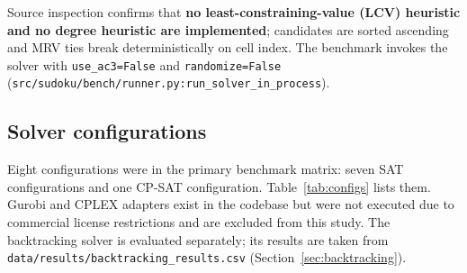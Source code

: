 \documentclass[a4paper,fleqn]{cas-sc}
\newcommand{\code}[1]{\texttt{\nolinkurl{#1}}}
\begin{document}
Source inspection confirms that \textbf{no least-constraining-value (LCV) heuristic and no degree heuristic are implemented}; candidates are sorted ascending and MRV ties break deterministically on cell index. The benchmark invokes the solver with \texttt{use\_ac3=False} and \texttt{randomize=False} (\code{src/sudoku/bench/runner.py:run_solver_in_process}).

\subsection{Solver configurations}

Eight configurations were in the primary benchmark matrix: seven SAT configurations and one CP-SAT configuration. Table~\ref{tab:configs} lists them. Gurobi and CPLEX adapters exist in the codebase but were not executed due to commercial license restrictions and are excluded from this study. The backtracking solver is evaluated separately; its results are taken from \code{data/results/backtracking_results.csv} (Section~\ref{sec:backtracking}).

\begin{table}[htbp]
\centering
\caption{Solver configurations in the primary benchmark.}
\label{tab:configs}
\small
{}
\end{table}

\end{document}

